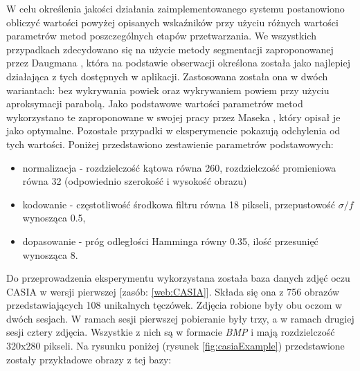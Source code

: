 W celu określenia jakości działania zaimplementowanego systemu postanowiono obliczy\'c wartości powyżej opisanych wska\'zników
przy użyciu różnych wartości parametrów metod poszczególnych etapów przetwarzania. We wszystkich przypadkach zdecydowano
się na użycie metody segmentacji zaproponowanej przez Daugmana \cite{DaugmanHowIrisRecognitionWorks}, która na podstawie obserwacji
określona została jako najlepiej działająca z tych dostępnych w aplikacji. Zastosowana została ona w dwóch wariantach:
bez wykrywania powiek oraz wykrywaniem powiem przy użyciu aproksymacji parabolą. Jako podstawowe wartości parametrów
metod wykorzystano te zaproponowane w swojej pracy przez Maseka \cite{masek}, który opisał je jako optymalne. Pozostałe
przypadki w eksperymencie pokazują odchylenia od tych wartości. Poniżej przedstawiono zestawienie parametrów podstawowych:

\begin{itemize}
  \item normalizacja - rozdzielczoś\'c kątowa równa 260, rozdzielczoś\'c promieniowa równa 32 (odpowiednio szerokoś\'c i wysokoś\'c obrazu)
  \item kodowanie - częstotliwoś\'c środkowa filtru równa 18 pikseli, przepustowoś\'c $\sigma/f$ wynosząca 0.5,
  \item dopasowanie - próg odległości Hamminga równy 0.35, iloś\'c przesunię\'c wynosząca 8.
\end{itemize}

Do przeprowadzenia eksperymentu wykorzystana została baza danych zdję\'c oczu CASIA w wersji pierwszej [zasób: \ref{web:CASIA}].
Składa się ona z 756 obrazów przedstawiających 108 unikalnych tęczówek. Zdjęcia robione były obu oczom w dwóch
sesjach. W ramach sesji pierwszej pobieranie były trzy, a w ramach drugiej sesji cztery zdjęcia. Wszystkie z nich
są w formacie \textit{BMP} i mają rozdzielczoś\'c 320x280 pikseli. Na rysunku poniżej (rysunek \ref{fig:casiaExample})
przedstawione zostały przykładowe obrazy z tej bazy:\newline

